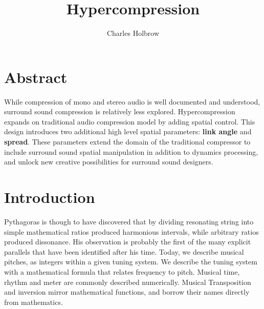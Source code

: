 \documentclass{tufte-book}
\title{Hypercompression}
\author{Charles Holbrow}
\newcommand{\TODO}[1]{\textcolor{red}{\bf TODO:#1}\xspace}
\newcommand{\thesis}{Hypercompression\xspace}
\begin{document}
\frontmatter

\maketitle

\tableofcontents

\mainmatter

\chapter*{Abstract}
\label{ch:abstract}

\marginnote{\TODO{ Abstract is copy/pasted from another section, and
    should probably be re-written from scratch}} While compression of
mono and stereo audio is well documented and
understood,\cite{Giannoulis2012, Blesser1969} surround sound
compression is relatively less explored.  \thesis expands on
traditional audio compression model by adding spatial control. This
design introduces two additional high level spatial parameters:
\textbf{link angle} and \textbf{spread}. These parameters extend the
domain of the traditional compressor to include surround sound spatial
manipulation in addition to dynamics processing, and unlock new
creative possibilities for surround sound designers.


\cleardoublepage
\chapter{Introduction}
\label{ch:introduction}

\begin{fullwidth}
   Pythagoras is though to have discovered that
  by dividing resonating string into simple mathematical ratios
  produced harmonious intervals, while arbitrary ratios produced
  dissonance. His observation is probably the first of the many
  explicit parallels that have been identified after his time. Today,
  we describe musical pitches, as integers within a given tuning
  system. We describe the tuning system with a mathematical formula
  that relates frequency to pitch. Musical time, rhythm and meter are
  commonly described numerically. Musical Transposition and inversion
  mirror mathematical functions, and borrow their names directly from
  mathematics.
\end{fullwidth}
\end{document}

